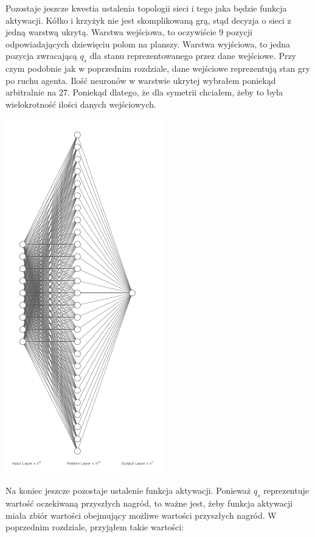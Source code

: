 \documentclass[licencjacka]{pracamgr}
\begin{document}
Pozostaje jeszcze kwestia ustalenia topologii sieci i tego jaka będzie funkcja aktywacji. Kółko i krzyżyk nie jest skomplikowaną grą, stąd decyzja o sieci z jedną warstwą ukrytą. Warstwa wejściowa, to oczywiście 9 pozycji odpowiadających dziewięciu polom na planszy. Warstwa wyjściowa, to jedna pozycja zwracającą $q_{s}$ dla stanu reprezentowanego przez dane wejściowe. Przy czym podobnie jak w poprzednim rozdziale, dane wejściowe reprezentują stan gry po ruchu agenta. Ilość neuronów w warstwie ukrytej wybrałem poniekąd arbitralnie na $27$. Poniekąd dlatego, że dla symetrii chciałem, żeby to była wielokrotność ilości danych wejściowych. 

\begin{flushleft}
	\includegraphics [scale=0.5]{nn_1pod.png}
\end{flushleft}


 Na koniec jeszcze pozostaje ustalenie funkcja aktywacji. Ponieważ $q_{s}$ reprezentuje wartość oczekiwaną przyszłych nagród, to ważne jest, żeby funkcja aktywacji miała zbiór wartości obejmujący możliwe wartości przyszłych nagród. W poprzednim rozdziale, przyjąłem takie wartości:
\end{document}

